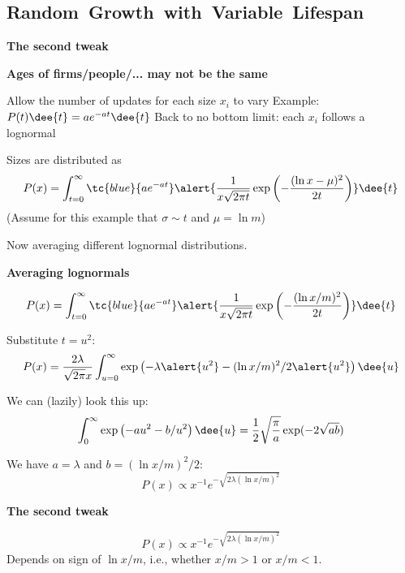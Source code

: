 \subsection{Random\ Growth\ with\ Variable\ Lifespan}

  \textbf{The second tweak}

  \textbf{Ages of firms/people/... may not be the same}
    
     Allow the number of updates for each size $x_i$
      to vary
     Example: $ P(t) \dee{t} = ae^{-at} \dee{t} $
     Back to no bottom limit: each $x_i$ follows
      a lognormal
    
      Sizes are distributed as\cite{mitzenmacher2003a}
      $$
      P(x) = \int_{t=0}^\infty
      \tc{blue}{a e^{-at}}
      \alert{
      \frac{1}{x \sqrt{2\pi t}}
      \exp
      \left(
        -\frac{(\ln x - \mu)^2}
        {2t}
      \right)
      }
      \dee{t}
      $$
      (Assume for this example that $\sigma \sim t$ and $\mu = \ln m$)
      
      Now averaging different lognormal distributions.
    
  


  \textbf{Averaging lognormals}

    
    
      $$
      P(x) = \int_{t=0}^\infty
      \tc{blue}{a e^{-at}}
      \alert{
        \frac{1}{x \sqrt{2\pi t}}
        \exp
        \left(
          -\frac{(\ln x/m)^2}
          {2t}
        \right)
      }
      \dee{t}
      $$
    
      Substitute $t = u^2$:
      $$
      P(x) = 
      \frac{2\lambda}{\sqrt{2\pi}x}
      \int_{u=0}^{\infty}
      \exp
      \left(
        -\lambda \alert{u^2}
        -(\ln x/m)^2 / 2 \alert{u^2} 
      \right)
      \dee{u}
      $$
    
      We can (lazily) look this up:\cite{gradshteyn1965a}
      $$
      \int_{0}^{\infty} \exp \left( -au^2 - b/u^2 \right) \dee{u}
      = 
      \frac{1}{2}\sqrt{\frac{\pi}{a}} \exp(-2\sqrt{ab})
      $$
    
      We have $a = \lambda$ and $b=(\ln x/m)^2/2$:
      $$
      P(x)
      \propto
      x^{-1} e^{- \sqrt{2\lambda (\ln x/m) ^2}} 
      $$
    


  \textbf{The second tweak}

  
   $$
    P(x)
    \propto
    x^{-1} e^{- \sqrt{2\lambda (\ln x/m) ^2}} 
    $$
   Depends on sign of $\ln x/m$, i.e., whether $x/m>1$ or $x/m<1$.
   
